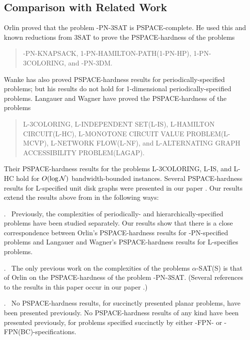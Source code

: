 \vspace*{-0.15in}
\subsection{Comparison with Related Work}\label{sec:comp}
Orlin \cite{Or82a} proved that the problem {-PN-3SAT} is 
{\sf PSPACE-}complete. He used this and known reductions from {\sf 3SAT} 
to prove the {\sf PSPACE-}hardness of the problems 
\begin{quote}
{-PN-KNAPSACK, 1-PN-HAMILTON-PATH(1-PN-HP), 1-PN-3COLORING,} and 
{-PN-3DM}.
\end{quote}
Wanke \cite{Wa93} has also proved {\sf PSPACE-}hardness results for periodically-specified problems; but his results do not hold for 1-dimensional 
periodically-specified problems. Langauer and Wagner \cite{LW92} have proved
the {\sf PSPACE}-hardness of the problems 
\begin{quote}
{\sf L-3COLORING, L-INDEPENDENT SET(L-IS), L-HAMILTON CIRCUIT(L-HC), L-MONOTONE CIRCUIT  VALUE PROBLEM(L-MCVP), L-NETWORK FLOW(L-NF),} and {\sf L-ALTERNATING GRAPH ACCESSIBILITY PROBLEM(LAGAP).}
\end{quote}
Their {\sf PSPACE-}hardness results for the problems {\sf L-3COLORING, L-IS,}
and {\sf L-HC} hold for $O(\log {\cal N})$ bandwidth-bounded instances. Several
{\sf PSPACE-}hardness results for {\sf L-}specified unit disk graphs were 
presented in our paper \cite{MR+93}. 
Our results extend the results above from \cite{Or82a,LW92}  
in the following ways:

{}.~ Previously, the complexities of periodically- and hierarchically-specified
problems have been studied separately. Our results show that there is a
 close correspondence between Orlin's {\sf PSPACE-}hardness results for {-PN-}specified problems and Langauer and Wagner's {\sf PSPACE-}hardness 
results for {\sf L-}specifies problems.

\smallskip
{}.~
The only previous work on the complexities of the problems 
$\alpha$-{\sf SAT(S)} is that of Orlin \cite{Or82a} on the 
{\sf PSPACE-}hardness of the problem {-PN-3SAT}. (Several references
to the results in this paper occur in our paper \cite{MR+93}.)

\smallskip
{}.~
No {\sf PSPACE-}hardness results, for succinctly presented 
planar problems, have been presented previously. No {\sf PSPACE-}hardness 
results of any kind have been presented previously, for problems specified
succinctly by either {-FPN-} or {-FPN(BC)-}specifications.

